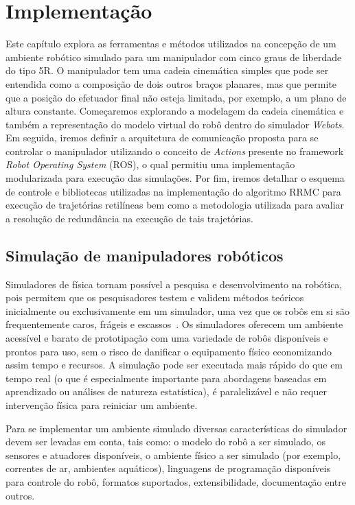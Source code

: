 \chapter{Implementação}\label{cap:methods}

Este capítulo explora as ferramentas e métodos utilizados na
concepção de um ambiente robótico simulado para um manipulador com cinco graus
de liberdade do tipo 5R. O manipulador tem uma cadeia cinemática simples que
pode ser entendida como a composição de dois outros braços planares, mas que
permite que a posição do efetuador final não esteja limitada, por exemplo, a um
plano de altura constante. Começaremos explorando a modelagem da cadeia
cinemática e também a representação do modelo virtual do robô dentro do
simulador \emph{Webots}. Em seguida, iremos definir a arquitetura de
comunicação proposta para se controlar o manipulador utilizando o conceito de
\emph{Actions} presente no framework \emph{Robot Operating System} (ROS), o
qual permitiu uma implementação modularizada para execução das simulações.
Por fim, iremos detalhar o esquema de controle e bibliotecas utilizadas na
implementação do algoritmo RRMC para execução de trajetórias retilíneas bem como a
metodologia utilizada para avaliar a resolução de redundância na execução de 
tais trajetórias.

\section{Simulação de manipuladores robóticos}

Simuladores de física tornam possível a pesquisa e desenvolvimento na robótica,
pois permitem que os pesquisadores testem e validem métodos teóricos
inicialmente ou exclusivamente em um simulador, uma vez que os robôs em si são
frequentemente caros, frágeis e escassos~\cite{robotic_applications}. Os
simuladores oferecem um ambiente acessível e barato de prototipação com uma
variedade de robôs disponíveis e prontos para uso, sem o risco de danificar o
equipamento físico economizando assim tempo e recursos. A simulação pode ser
executada mais rápido do que em tempo real (o que é especialmente importante
para abordagens baseadas em aprendizado ou análises de natureza estatística), é
paralelizável e não requer intervenção física para reiniciar um ambiente.

Para se implementar um ambiente simulado diversas características do simulador
devem ser levadas em conta, tais como: o modelo do robô a ser simulado, os
sensores e atuadores disponíveis, o ambiente físico a ser simulado (por
exemplo, correntes de ar, ambientes aquáticos), linguagens de programação
disponíveis para controle do robô, formatos suportados, extensibilidade,
documentação entre outros.

